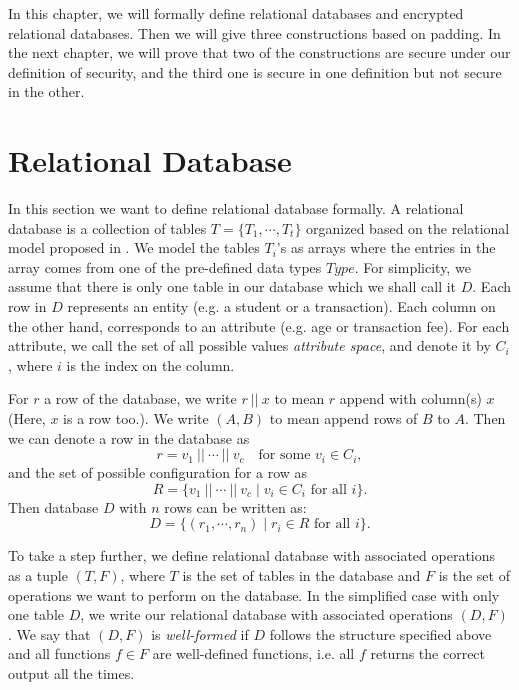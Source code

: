 In this chapter, we will formally define relational databases and encrypted relational databases. Then we will give three constructions based on padding. In the next chapter, we will prove that two of the constructions are secure under our definition of security, and the third one is secure in one definition but not secure in the other.




\section{Relational Database}
In this section we want to define relational database formally. A relational database is a collection of tables $T = \{T_1, \cdots, T_t\}$ organized based on the relational model proposed in \cite{Codd:1970:RMD:362384.362685}. We model the tables $T_i$'s as arrays where the entries in the array comes from one of the pre-defined data types $Type$. For simplicity, we assume that there is only one table in our database which we shall call it $D$. Each row in $D$ represents an entity (e.g. a student or a transaction). Each column on the other hand, corresponds to an attribute (e.g. age or transaction fee). For each attribute, we call the set of all possible values \textit{attribute space}, and denote it by $C_i$, where $i$ is the index on the column.

For $r$ a row of the database, we write $r \ || \ x$ to mean $r$ append with column(s) $x$ (Here, $x$ is a row too.). We write $(A, B)$ to mean append rows of $B$ to $A$. Then we can denote a row in the database as
\begin{equation*}
	r = v_1 \ || \ \cdots \ || \ v_c \quad \text{for some } v_i \in C_i,
\end{equation*}
and the set of possible configuration for a row as
\begin{equation*}
	R = \{v_1 \ || \ \cdots \ || \ v_c \mid v_i \in C_i \text{ for all } i \}.
\end{equation*}
Then database $D$ with $n$ rows can be written as:
\begin{equation*}
	D = \{ (r_1, \cdots, r_n) \mid r_i \in R \text{ for all } i \}.
\end{equation*}

To take a step further, we define relational database with associated operations as a tuple $(T, F)$, where $T$ is the set of tables in the database and $F$ is the set of operations we want to perform on the database. In the simplified case with only one table $D$, we write our relational database with associated operations $(D, F)$. We say that $(D, F)$ is \textit{well-formed} if $D$ follows the structure specified above and all functions $f \in F$ are well-defined functions, i.e. all $f$ returns the correct output all the times.




